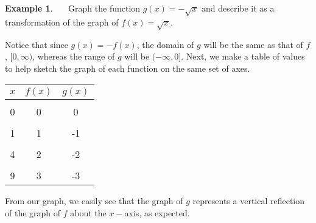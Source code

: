 \documentclass[12pt]{book}
\theoremstyle{definition}
\newtheorem{example}{Example}
\begin{document}
\begin{example}~~~Graph the function $g(x)=-\sqrt{x}$ and describe it as a transformation of the graph of $f(x)=\sqrt{x}$.\par
Notice that since $g(x)=-f(x)$, the domain of $g$ will be the same as that of $f$, $[0,\infty)$, whereas the range of $g$ will be $(-\infty,0]$.  Next, we make a table of values to help sketch the graph of each function on the same set of axes.
\begin{multicols}{2}
\begin{center}
\begin{tabular}{c||c|c}
$x$ & $f(x)$ &  $g(x)$ \\
\hline
&&\\
0 & 0 &  0 \\
&&\\
1 & 1 &  -1 \\
&&\\
4 & 2 &  -2 \\
&&\\
9 & 3 &  -3 
\end{tabular}
\end{center}
\columnbreak
\begin{center}
\end{center}
\end{multicols}
From our graph, we easily see that the graph of $g$ represents a vertical reflection of the graph of $f$ about the $x-$axis, as expected.
\end{example}
\end{document}
